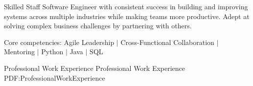 \documentclass[MMMMyyyy,nonstopmode]{simpleresumecv_stacked}
\newcommand{\comment}[1]{\ignorespaces} %
\begin{document}
\begin{Body}

\item




\begin{center}
Skilled Staff Software Engineer with consistent success in building and improving systems across multiple industries while making teams more productive.
Adept at solving complex business challenges by partnering with others.

\BigGap
Core competencies:
Agile Leadership $|$ Cross-Functional Collaboration $|$ \comment{System Design $|$ } \comment{Linux $|$} Mentoring $|$ Python $|$ Java $|$ \comment{CI/CD Automation $|$ } SQL 
\end{center}



\Section
{Professional Work Experience}
{Professional Work Experience}
{PDF:ProfessionalWorkExperience}


\end{Body}
\end{document}
